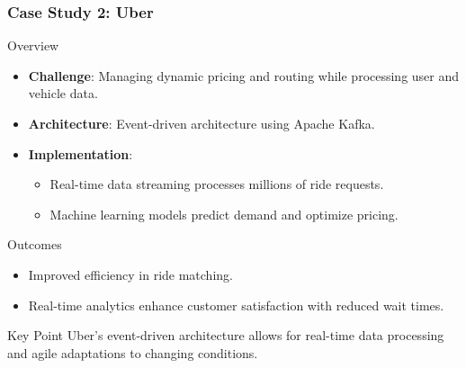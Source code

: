 \documentclass[aspectratio=169]{beamer}
\begin{document}
\begin{frame}[fragile]
    \frametitle{Case Study 2: Uber}
    \begin{block}{Overview}
        \begin{itemize}
            \item \textbf{Challenge}: Managing dynamic pricing and routing while processing user and vehicle data.
            \item \textbf{Architecture}: Event-driven architecture using Apache Kafka.
            \item \textbf{Implementation}:
            \begin{itemize}
                \item Real-time data streaming processes millions of ride requests.
                \item Machine learning models predict demand and optimize pricing.
            \end{itemize}
        \end{itemize}
    \end{block}
    \begin{block}{Outcomes}
        \begin{itemize}
            \item Improved efficiency in ride matching.
            \item Real-time analytics enhance customer satisfaction with reduced wait times.
        \end{itemize}
    \end{block}
    \begin{block}{Key Point}
        Uber's event-driven architecture allows for real-time data processing and agile adaptations to changing conditions.
    \end{block}
\end{frame}
\end{document}
